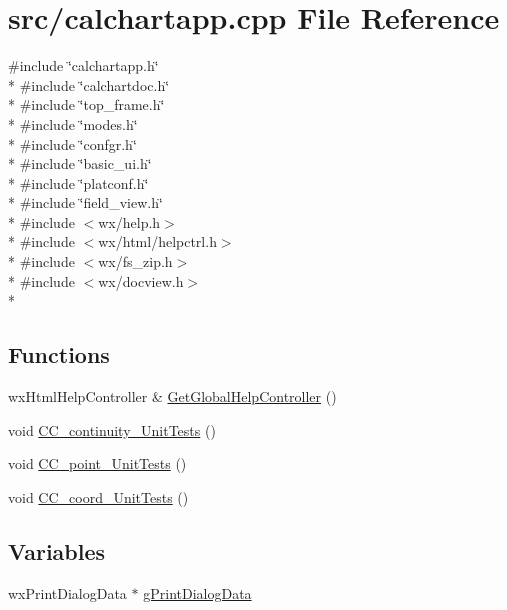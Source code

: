 \hypertarget{a00178}{\section{src/calchartapp.cpp File Reference}
\label{a00178}
}
{\ttfamily \#include \char`\"{}calchartapp.\-h\char`\"{}}\\*
{\ttfamily \#include \char`\"{}calchartdoc.\-h\char`\"{}}\\*
{\ttfamily \#include \char`\"{}top\-\_\-frame.\-h\char`\"{}}\\*
{\ttfamily \#include \char`\"{}modes.\-h\char`\"{}}\\*
{\ttfamily \#include \char`\"{}confgr.\-h\char`\"{}}\\*
{\ttfamily \#include \char`\"{}basic\-\_\-ui.\-h\char`\"{}}\\*
{\ttfamily \#include \char`\"{}platconf.\-h\char`\"{}}\\*
{\ttfamily \#include \char`\"{}field\-\_\-view.\-h\char`\"{}}\\*
{\ttfamily \#include $<$wx/help.\-h$>$}\\*
{\ttfamily \#include $<$wx/html/helpctrl.\-h$>$}\\*
{\ttfamily \#include $<$wx/fs\-\_\-zip.\-h$>$}\\*
{\ttfamily \#include $<$wx/docview.\-h$>$}\\*
\subsection*{Functions}
\begin{DoxyCompactItemize}
\item 
wx\-Html\-Help\-Controller \& \hyperlink{a00178_adb0ea64e1302ed89712d1d05903f5400}{Get\-Global\-Help\-Controller} ()
\item 
void \hyperlink{a00178_a8daadaacfcc6d54a48f7853fe864bc46}{C\-C\-\_\-continuity\-\_\-\-Unit\-Tests} ()
\item 
void \hyperlink{a00178_a96313599b1daa9badacfb3eae6aa74de}{C\-C\-\_\-point\-\_\-\-Unit\-Tests} ()
\item 
void \hyperlink{a00178_a6014cc2d64702c71dff02ed2f3feca4d}{C\-C\-\_\-coord\-\_\-\-Unit\-Tests} ()
\end{DoxyCompactItemize}
\subsection*{Variables}
\begin{DoxyCompactItemize}
\item 
wx\-Print\-Dialog\-Data $\ast$ \hyperlink{a00178_a896ed5b078417657f1ceef1e87abe705}{g\-Print\-Dialog\-Data}
\end{DoxyCompactItemize}


